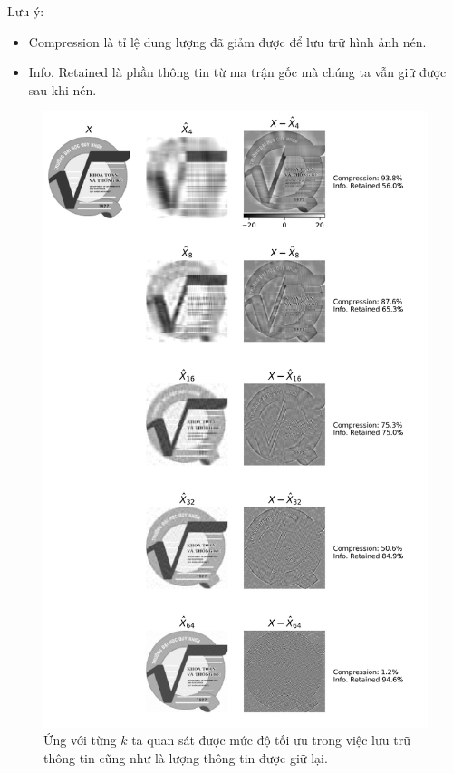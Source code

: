 \documentclass[14pt,oneside,a4paper]{report}
\numberwithin{equation}{section}
\begin{document}
Lưu ý: 
\begin{itemize}
\item Compression là tỉ lệ dung lượng đã giảm được để lưu trữ hình ảnh nén.
\item Info. Retained là phần thông tin từ ma trận gốc mà chúng ta vẫn giữ được sau khi nén.
\end{itemize}

\begin{figure}[htp]
\centering
\includegraphics[scale=0.7]{svd_qnu.png}
\caption{Ứng với từng $k$ ta quan sát được mức độ tối ưu trong việc lưu trữ thông tin cũng như là lượng thông tin được giữ lại.}
\label{fig:svd_qnu}
\end{figure}
\newpage
\end{document}
